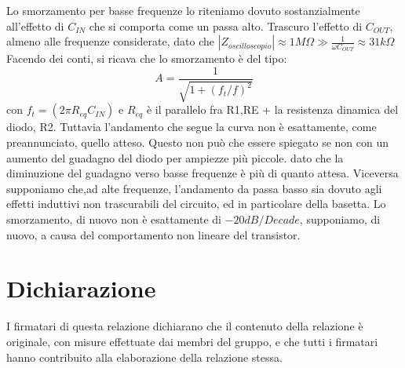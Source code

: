 \documentclass[10pt,a4paper]{article}
\begin{document}
Lo smorzamento per basse frequenze lo riteniamo dovuto sostanzialmente all'effetto di $C_{IN}$ che si comporta come un passa alto. Trascuro l'effetto di $C_{OUT}$, almeno alle frequenze considerate, dato che $|Z_{oscilloscopio}|\approx1 M\Omega\gg \frac{1}{\omega C_{OUT}}\approx31k\Omega$
Facendo dei conti, si ricava che lo smorzamento è del tipo:\[A=\frac{1}{\sqrt{1+(f_t/f)^2}}\] con $f_t=(2\pi R_{eq} C_{IN})$ e $R_{eq}$ è il parallelo fra R1,RE + la resistenza dinamica del diodo, R2.
Tuttavia l'andamento che segue la curva  non è esattamente, come preannunciato, quello atteso. Questo non può che essere spiegato se non con un aumento del guadagno del diodo per ampiezze più piccole. dato che la diminuzione del guadagno verso basse frequenze è più di quanto attesa.
Viceversa supponiamo che,ad  alte frequenze, l'andamento da passa basso sia dovuto agli effetti induttivi non trascurabili del circuito, ed in particolare della basetta.
Lo smorzamento, di nuovo non è esattamente di $-20 dB/Decade$, supponiamo, di nuovo, a causa del comportamento non lineare del transistor.

\section*{Dichiarazione}
I firmatari di questa relazione dichiarano che il contenuto della relazione \`e originale, con misure effettuate dai membri del gruppo, e che tutti i firmatari hanno contribuito alla elaborazione della relazione stessa.
\end{document}
